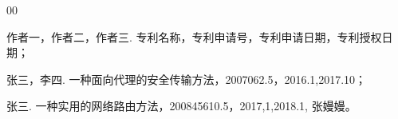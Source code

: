\begin{patent}{00}
    \item [{[1]}]  作者一，作者二，作者三. 专利名称，专利申请号，专利申请日期，专利授权日期；
    
    \item [{[2]}]  张三，李四. 一种面向代理的安全传输方法，2007062.5，2016.1,2017.10；
    
    \item [{[3]}]  张三. 一种实用的网络路由方法，200845610.5，2017,1,2018.1, 张嫚嫚。
    


\end{patent}

